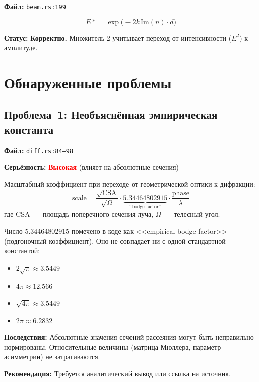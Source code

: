\documentclass[12pt,a4paper]{article}
\begin{document}
\textbf{Файл:} \texttt{beam.rs:199}

\[
  E \mathrel{*}= \exp\!\bigl(-2k\,\mathrm{Im}(n)\cdot d\bigr)
\]

\textbf{Статус:} \textcolor{green!50!black}{\textbf{Корректно.}}
Множитель 2 учитывает переход от интенсивности ($E^2$) к амплитуде.


\section{Обнаруженные проблемы}

\subsection{Проблема~1: Необъяснённая эмпирическая константа}

\textbf{Файл:} \texttt{diff.rs:84--98}

\textbf{Серьёзность:} \textcolor{red}{\textbf{Высокая}} (влияет на абсолютные сечения)

Масштабный коэффициент при переходе от геометрической оптики к дифракции:
\[
  \mathrm{scale} = \frac{\sqrt{\mathrm{CSA}}}{\sqrt{\Omega}} \cdot
  \underbrace{5.34464802915}_{\text{``bodge factor''}} \cdot
  \frac{\mathrm{phase}}{\lambda}
\]
где CSA~--- площадь поперечного сечения луча, $\Omega$~--- телесный угол.

Число $5.34464802915$ помечено в коде как <<empirical bodge factor>>
(подгоночный коэффициент). Оно не совпадает ни с одной стандартной константой:
\begin{itemize}[nosep]
  \item $2\sqrt{\pi} \approx 3.5449$
  \item $4\pi \approx 12.566$
  \item $\sqrt{4\pi} \approx 3.5449$
  \item $2\pi \approx 6.2832$
\end{itemize}

\textbf{Последствия:} Абсолютные значения сечений рассеяния могут быть
неправильно нормированы. Относительные величины (матрица Мюллера,
параметр асимметрии) не затрагиваются.

\textbf{Рекомендация:} Требуется аналитический вывод или ссылка на источник.
\end{document}
